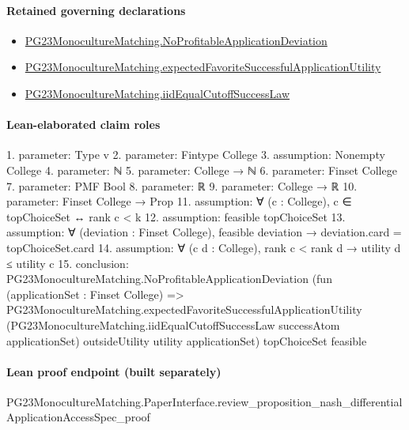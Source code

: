 \documentclass[10pt]{article}
\begin{document}
\paragraph{Retained governing declarations}
\begin{itemize}\raggedright
\item \hyperlink{governing-declaration-544dda25d6c6c832}{PG23\allowbreak{}Monoculture\allowbreak{}Matching.\allowbreak{}No\allowbreak{}Profitable\allowbreak{}Application\allowbreak{}Deviation}
\item \hyperlink{governing-declaration-5029a79e0e9dd20c}{PG23\allowbreak{}Monoculture\allowbreak{}Matching.\allowbreak{}expected\allowbreak{}Favorite\allowbreak{}Successful\allowbreak{}Application\allowbreak{}Utility}
\item \hyperlink{governing-declaration-d83442d1edbd9146}{PG23\allowbreak{}Monoculture\allowbreak{}Matching.\allowbreak{}iid\allowbreak{}Equal\allowbreak{}Cutoff\allowbreak{}Success\allowbreak{}Law}
\end{itemize}
\paragraph{Lean-elaborated claim roles}\begin{ReviewVerbatim}
1. parameter: Type v
2. parameter: Fintype College
3. assumption: Nonempty College
4. parameter: ℕ
5. parameter: College → ℕ
6. parameter: Finset College
7. parameter: PMF Bool
8. parameter: ℝ
9. parameter: College → ℝ
10. parameter: Finset College → Prop
11. assumption: ∀ (c : College), c ∈ topChoiceSet ↔ rank c < k
12. assumption: feasible topChoiceSet
13. assumption: ∀ (deviation : Finset College), feasible deviation → deviation.card = topChoiceSet.card
14. assumption: ∀ (c d : College), rank c < rank d → utility d ≤ utility c
15. conclusion: PG23MonocultureMatching.NoProfitableApplicationDeviation
  (fun (applicationSet : Finset College) =>
    PG23MonocultureMatching.expectedFavoriteSuccessfulApplicationUtility
      (PG23MonocultureMatching.iidEqualCutoffSuccessLaw successAtom applicationSet) outsideUtility utility
      applicationSet)
  topChoiceSet feasible
\end{ReviewVerbatim}

\paragraph{Lean proof endpoint (built separately)}\begin{ReviewVerbatim}
PG23MonocultureMatching.PaperInterface.review_proposition_nash_differentialApplicationAccessSpec_proof
\end{ReviewVerbatim}
\end{document}
